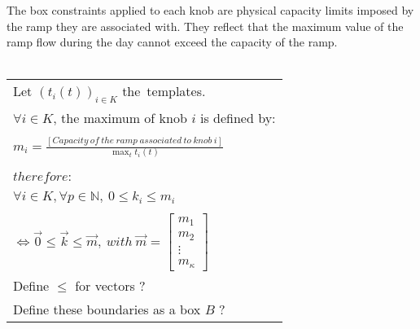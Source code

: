 The box constraints applied to each knob are physical capacity limits imposed by the ramp they are associated with. They reflect that the maximum value of the ramp flow during the day cannot exceed the capacity of the ramp.\\
\\
\begin{tabular}{l}
	Let $(t_{i}(t))_{i\in{K}}$ the\ templates. \\
	$\forall i\in{K}$, the maximum of knob $i$ is defined by:
	\\
	\\
		$m_{i}=\frac{[Capacity\ of\ the\ ramp\ associated\ to\ knob\ i]}{\max_{t} t_{i}(t)}$\\
	\\
	\\
	$therefore:$ \\
	\\
	$\forall i\in{K},\forall p\in{\mathbb{N}},\ 0\leq k_{i}\leq m_{i}$\\
	\\
	$\Leftrightarrow  \vec{0}\leq \vec{k}\leq \vec{m},\ with\ \vec{m} =\begin{bmatrix}m_{1}\\m_{2}\\\vdots\\m_{\kappa}\end{bmatrix}$\\
	\color{red}Define $\leq$ for vectors ?\\
	 \color{red}Define these boundaries as a box $B$ ?\color{black}
\end{tabular}




	